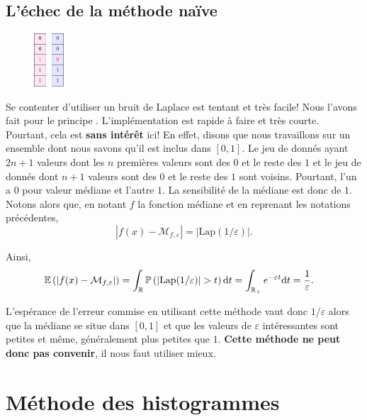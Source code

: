 \subsection{L'échec de la méthode naïve}

\begin{figure}
    \centering
    \includegraphics[width=0.10\textwidth, clip]{"./proofs/figures/6HBRJaKv0r342kYs.pdf"}
\end{figure}

Se contenter d'utiliser un bruit de {\sc Laplace} est tentant et très facile! Nous l'avons fait pour le principe \cite{git}. L'implémentation est rapide à faire et très courte. Pourtant, cela est \textbf{sans intérêt} ici! En effet, disons que nous travaillons sur un ensemble dont nous savons qu'il est inclus dans \([0,1]\). Le jeu de donnés ayant \(2n + 1\) valeurs dont les \(n\) premières valeurs sont des \(0\) et le reste des \(1\) et le jeu de donnés dont \(n+1\) valeurs sont des \(0\) et le reste des \(1\) sont voisins. Pourtant, l'un a \(0\) pour valeur médiane et l'autre \(1\). La sensibilité de la médiane est donc de \(1\). Notons alors que, en notant \(f\) la fonction médiane et en reprenant les notations précédentes, 
\[
    |f(x) - \mathcal M_{f, \varepsilon}| = |\text{Lap}(1/\varepsilon)|.    
\]

Ainsi,
\begin{align*}
    \mathbb E\left( |f(x) - \mathcal M_{f, \varepsilon}| \right) & = \int_{\mathbb{R}} \mathbb P \left( |\text{Lap}(1/\varepsilon)| > t \right) \mathrm{d} t = \int_{\mathbb{R}_+} e^{-\varepsilon t}  \mathrm{d} t = \dfrac{1}{\varepsilon}.
\end{align*}

L'espérance de l'erreur commise en utilisant cette méthode vaut donc \(1/\varepsilon\) alors que la médiane se situe dans \([0,1]\) et que les valeurs de \(\varepsilon\) intéressantes sont petites et même, généralement plus petites que \(1\). \textbf{Cette méthode ne peut donc pas convenir}, il nous faut utiliser mieux.


\section{Méthode des histogrammes}

